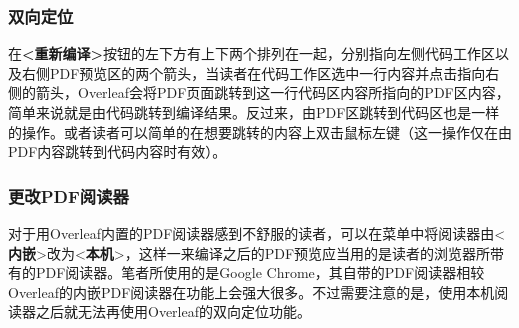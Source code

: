 \subsubsection{双向定位}

在\textbf{<重新编译>}按钮的左下方有上下两个排列在一起，分别指向左侧代码工作区以及右侧PDF预览区的两个箭头，当读者在代码工作区选中一行内容并点击指向右侧的箭头，Overleaf会将PDF页面跳转到这一行代码区内容所指向的PDF区内容，简单来说就是由代码跳转到编译结果。反过来，由PDF区跳转到代码区也是一样的操作。或者读者可以简单的在想要跳转的内容上双击鼠标左键（这一操作仅在由PDF内容跳转到代码内容时有效）。

\subsubsection{更改PDF阅读器}

对于用Overleaf内置的PDF阅读器感到不舒服的读者，可以在菜单中将阅读器由<\textbf{内嵌}>改为<\textbf{本机}>，这样一来编译之后的PDF预览应当用的是读者的浏览器所带有的PDF阅读器。笔者所使用的是Google Chrome，其自带的PDF阅读器相较Overleaf的内嵌PDF阅读器在功能上会强大很多。不过需要注意的是，使用本机阅读器之后就无法再使用Overleaf的双向定位功能。

